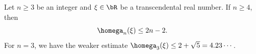 \begin{Thm}
\label{Thm : main d=2}
Let $n\geq 3$ be an integer and $\xi\in\bR$ be a transcendental real number. If $n\geq 4$, then
\begin{equation*}
\homega_n(\xi) \leq 2n-2.
\end{equation*}
For $n=3$, we have the weaker estimate $\homega_3(\xi)\leq 2+\sqrt 5 = 4.23\cdots$.
\end{Thm}
